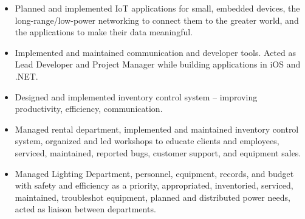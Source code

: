 \documentclass[letterpaper]{article}        %
\begin{document}
    \begin{itemize}
    \item Planned and implemented IoT applications for small, embedded devices, the long-range/low-power networking to connect them to the greater world, and the applications to make their data meaningful.
    \end{itemize}
  
    \begin{itemize}
    \item Implemented and maintained communication and developer tools.  Acted as Lead Developer and Project Manager while building applications in iOS and .NET.
    \end{itemize}
  
    \begin{itemize}
    \item Designed and implemented inventory control system -- improving productivity, efficiency, communication.
    \end{itemize}
  
    \begin{itemize}
    \item Managed rental department, implemented and maintained inventory control system, organized and led workshops to educate clients and employees, serviced, maintained, reported bugs, customer support, and equipment sales.
    \end{itemize}
  
    \begin{itemize}
    \item Managed Lighting Department, personnel, equipment, records, and budget with safety and efficiency as a priority, appropriated, inventoried, serviced, maintained, troubleshot equipment, planned and distributed power needs, acted as liaison between departments.
    \end{itemize}

\end{document}
